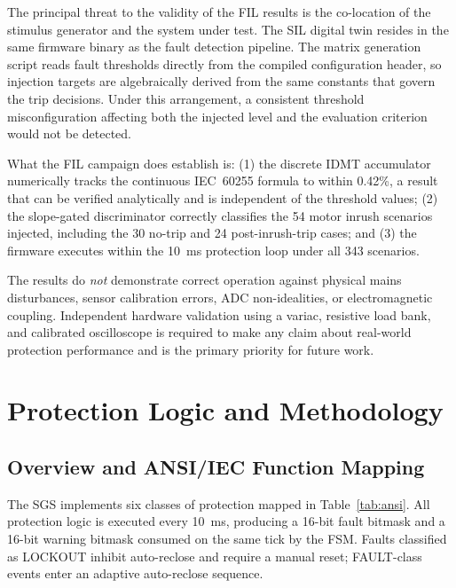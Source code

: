 \documentclass[conference]{IEEEtran}
\begin{document}
The principal threat to the validity of the FIL results is the
co-location of the stimulus generator and the system under test.  The
SIL digital twin resides in the same firmware binary as the fault
detection pipeline.  The matrix generation script reads fault
thresholds directly from the compiled configuration header, so
injection targets are algebraically derived from the same constants
that govern the trip decisions.  Under this arrangement, a consistent
threshold misconfiguration affecting both the injected level and the
evaluation criterion would not be detected.

What the FIL campaign does establish is: (1) the discrete IDMT
accumulator numerically tracks the continuous IEC~60255 formula to
within 0.42\%, a result that can be verified analytically and is
independent of the threshold values; (2) the slope-gated discriminator
correctly classifies the 54 motor inrush scenarios injected, including
the 30 no-trip and 24 post-inrush-trip cases; and (3) the firmware
executes within the \SI{10}{\milli\second} protection loop under all
343 scenarios.

The results do \emph{not} demonstrate correct operation against
physical mains disturbances, sensor calibration errors, ADC non-idealities,
or electromagnetic coupling.  Independent hardware validation using a
variac, resistive load bank, and calibrated oscilloscope is required to
make any claim about real-world protection performance and is the
primary priority for future work.

\section{Protection Logic and Methodology}

\subsection{Overview and ANSI/IEC Function Mapping}

The SGS implements six classes of protection mapped in Table~\ref{tab:ansi}.
All protection logic is executed every \SI{10}{\milli\second}, producing
a 16-bit fault bitmask and a 16-bit warning bitmask consumed on the
same tick by the FSM.  Faults classified as LOCKOUT inhibit auto-reclose
and require a manual reset; FAULT-class events enter an adaptive
auto-reclose sequence.
\end{document}
